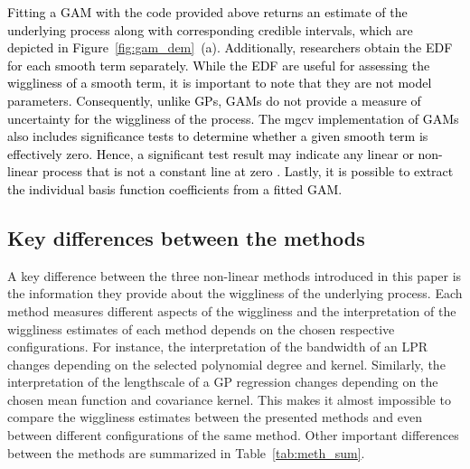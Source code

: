 \documentclass[man, floatsintext]{apa7}
\begin{document}
\textcolor{black}{
  Fitting a GAM with the code provided above returns an estimate of the
  underlying process along with corresponding credible intervals, which are
  depicted in Figure~\ref{fig:gam_dem}~(a). Additionally, researchers obtain
  the EDF for each smooth term separately. While the EDF are useful for
  assessing the wiggliness of a smooth term, it is important to note that they
  are not model parameters. Consequently, unlike GPs, GAMs do not provide a
  measure of uncertainty for the wiggliness of the process. The mgcv
  implementation of GAMs also includes significance tests to determine whether
  a given smooth term is effectively zero. Hence, a significant test result
  may indicate any linear or non-linear process that is not a constant line at
  zero \parencite{wood_p-values_2013,bringmann_changing_2017}. Lastly, it is
  possible to extract the individual basis function coefficients from a fitted
  GAM.}

\subsection{Key differences between the methods}

A key difference between the three non-linear methods introduced in this paper
is the information they provide about the wiggliness of the underlying process.
Each method measures different aspects of the wiggliness and the interpretation
of the wiggliness estimates of each method depends on the chosen respective
configurations. For instance, the interpretation of the bandwidth of an LPR
changes depending on the selected polynomial degree and kernel. Similarly, the
interpretation of the lengthscale of a GP regression changes depending on the
chosen mean function and covariance kernel. This makes it almost impossible to
compare the wiggliness estimates between the presented methods and even between
different configurations of the same method. Other important differences
between the methods are summarized in Table~\ref{tab:meth_sum}.
\end{document}
